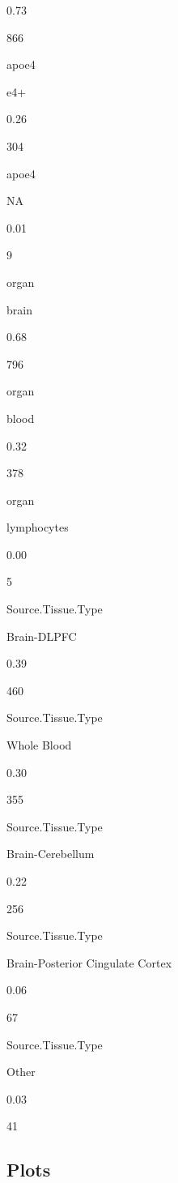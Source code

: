 \documentclass[]{book}
\newenvironment{Shaded}{\begin{snugshade}}{\end{snugshade}}
\newcommand{\DataTypeTok}[1]{\textcolor[rgb]{0.13,0.29,0.53}{#1}}
\newcommand{\DecValTok}[1]{\textcolor[rgb]{0.00,0.00,0.81}{#1}}
\newcommand{\KeywordTok}[1]{\textcolor[rgb]{0.13,0.29,0.53}{\textbf{#1}}}
\newcommand{\NormalTok}[1]{#1}
\newcommand{\OperatorTok}[1]{\textcolor[rgb]{0.81,0.36,0.00}{\textbf{#1}}}
\newcommand{\StringTok}[1]{\textcolor[rgb]{0.31,0.60,0.02}{#1}}
\begin{document}
0.73

866

apoe4

e4+

0.26

304

apoe4

NA

0.01

9

organ

brain

0.68

796

organ

blood

0.32

378

organ

lymphocytes

0.00

5

Source.Tissue.Type

Brain-DLPFC

0.39

460

Source.Tissue.Type

Whole Blood

0.30

355

Source.Tissue.Type

Brain-Cerebellum

0.22

256

Source.Tissue.Type

Brain-Posterior Cingulate Cortex

0.06

67

Source.Tissue.Type

Other

0.03

41

\hypertarget{plots-1}{%
\subsection{Plots}\label{plots-1}}

\begin{Shaded}
\end{Shaded}
\end{document}
